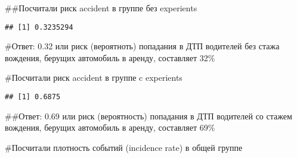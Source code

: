 \documentclass[
]{article}
\newenvironment{Shaded}{\begin{snugshade}}{\end{snugshade}}
\newcommand{\FunctionTok}[1]{\textcolor[rgb]{0.13,0.29,0.53}{\textbf{#1}}}
\newcommand{\NormalTok}[1]{#1}
\newcommand{\SpecialCharTok}[1]{\textcolor[rgb]{0.81,0.36,0.00}{\textbf{#1}}}
\newcommand{\StringTok}[1]{\textcolor[rgb]{0.31,0.60,0.02}{#1}}
\begin{document}
\#\#Посчитали риск accident в группе без experients

\begin{Shaded}
\end{Shaded}

\begin{verbatim}
## [1] 0.3235294
\end{verbatim}

\#Ответ: 0.32 или риск (вероятноть) попадания в ДТП водителей без стажа
вождения, берущих автомобиль в аренду, составляет 32\%

\#Посчитали риск accident в группе c experients

\begin{Shaded}
\end{Shaded}

\begin{verbatim}
## [1] 0.6875
\end{verbatim}

\#\#Ответ: 0.69 или риск (вероятность) попадания в ДТП водителей со
стажем вождения, берущих автомобиль в аренду, составляет 69\%

\#Посчитали плотность событий (incidence rate) в общей группе

\begin{Shaded}
\end{Shaded}
\end{document}
